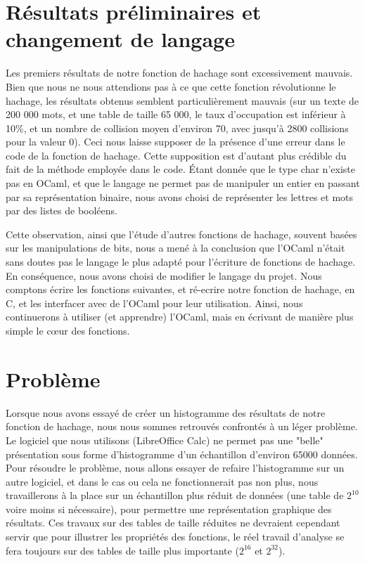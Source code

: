 \documentclass[final,twoside,article,10pt]{scrartcl}
\begin{document}
\section{Résultats préliminaires et changement de langage}
    Les premiers résultats de notre fonction de hachage sont excessivement mauvais.
    Bien que nous ne nous attendions pas à ce que cette fonction révolutionne le hachage, les résultats obtenus semblent particulièrement mauvais (sur un texte de 200 000 mots, et une table de taille 65 000, le taux d'occupation est inférieur à 10\%, et un nombre de collision moyen d'environ 70, avec jusqu'à 2800 collisions pour la valeur 0).
    Ceci nous laisse supposer de la présence d'une erreur dans le code de la fonction de hachage.
    Cette supposition est d'autant plus crédible du fait de la méthode employée dans le code.
    \'Etant donnée que le type char n'existe pas en OCaml, et que le langage ne permet pas de manipuler un entier en passant par sa représentation binaire, nous avons choisi de représenter les lettres et mots par des listes de booléens.
    \par Cette observation, ainsi que l'étude d'autres fonctions de hachage, souvent basées sur les manipulations de bits, nous a mené à la conclusion que l'OCaml n'était sans doutes pas le langage le plus adapté pour l'écriture de fonctions de hachage. En conséquence, nous avons choisi de modifier le langage du projet.
    Nous comptons écrire les fonctions suivantes, et ré-ecrire notre fonction de hachage, en C, et les interfacer avec de l'OCaml pour leur utilisation.
    Ainsi, nous continuerons à utiliser (et apprendre) l'OCaml, mais en écrivant de manière plus simple le c\oe ur des fonctions.


\section{Problème}
    Lorsque nous avons essayé de créer un histogramme des résultats de notre fonction de hachage, nous nous sommes retrouvés confrontés à un léger problème.
    Le logiciel que nous utilisons (LibreOffice Calc) ne permet pas une "belle" présentation sous forme d'histogramme d'un échantillon d'environ 65000 données.
    Pour résoudre le problème, nous allons essayer de refaire l'histogramme sur un autre logiciel, et dans le cas ou cela ne fonctionnerait pas non plus, nous travaillerons à la place sur un échantillon plus réduit de données (une table de $2^{10}$ voire moins si nécessaire), pour permettre une représentation graphique des résultats.
    Ces travaux sur des tables de taille réduites ne devraient cependant servir que pour illustrer les propriétés des fonctions, le réel travail d'analyse se fera toujours sur des tables de taille plus importante ($2^{16}$ et $2^{32}$).
\end{document}

